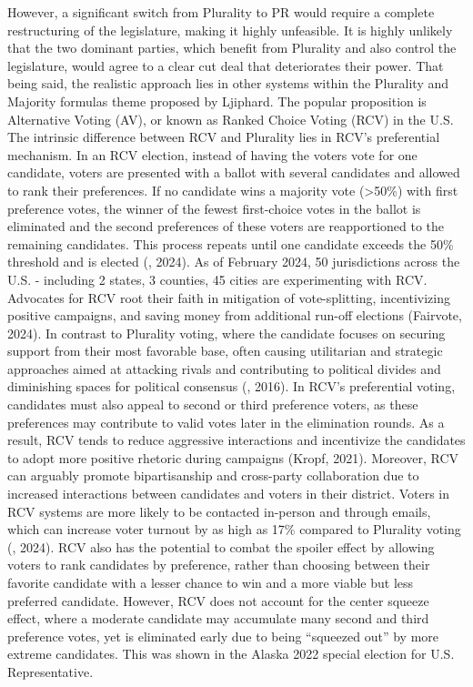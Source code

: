 \documentclass[12pt, a4paper, twoside]{article}
\begin{document}
However, a significant switch from Plurality to PR would require a complete restructuring of the legislature, making it highly unfeasible. It is highly unlikely that the two dominant parties, which benefit from Plurality and also control the legislature, would agree to a clear cut deal that deteriorates their power. That being said, the realistic approach lies in other systems within the Plurality and Majority formulas theme proposed by Ljiphard. The popular proposition is Alternative Voting (AV), or known as Ranked Choice Voting (RCV) in the U.S. The intrinsic difference between RCV and Plurality lies in RCV’s preferential mechanism. In an RCV election, instead of having the voters vote for one candidate, voters are presented with a ballot with several candidates and allowed to rank their preferences. If no candidate wins a majority vote (>50\%) with first preference votes, the winner of the fewest first-choice votes in the ballot is eliminated and the second preferences of these voters are reapportioned to the remaining candidates. This process repeats until one candidate exceeds the 50\% threshold and is elected (\cite{levy2024}, 2024). As of February 2024, 50 jurisdictions across the U.S. - including 2 states, 3 counties, 45 cities are experimenting with RCV. Advocates for RCV root their faith in mitigation of vote-splitting, incentivizing positive campaigns, and saving money from additional run-off elections (Fairvote, 2024). In contrast to Plurality voting, where the candidate focuses on securing support from their most favorable base, often causing utilitarian and strategic approaches aimed at attacking rivals and contributing to political divides and diminishing spaces for political consensus (\cite{donovan2016}, 2016). In RCV’s preferential voting, candidates must also appeal to second or third preference voters, as these preferences may contribute to valid votes later in the elimination rounds. As a result, RCV tends to reduce aggressive interactions and incentivize the candidates to adopt more positive rhetoric during campaigns (Kropf, 2021). Moreover, RCV can arguably promote bipartisanship and cross-party collaboration due to increased interactions between candidates and voters in their district. Voters in RCV systems are more likely to be contacted in-person and through emails, which can increase voter turnout by as high as 17\% compared to Plurality voting (\cite{dowling2024}, 2024). RCV also has the potential to combat the spoiler effect by allowing voters to rank candidates by preference, rather than choosing between their favorite candidate with a lesser chance to win and a more viable but less preferred candidate. However, RCV does not account for the center squeeze effect, where a moderate candidate may accumulate many second and third preference votes, yet is eliminated early due to being “squeezed out” by more extreme candidates. This was shown in the Alaska 2022 special election for U.S. Representative. 
\end{document}
